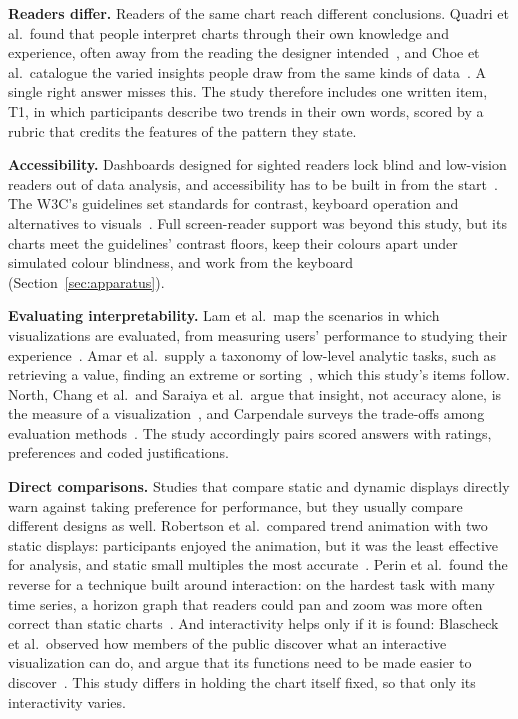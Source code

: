 \documentclass[10pt,twocolumn]{article}
\begin{document}
\textbf{Readers differ.} Readers of the same chart reach different conclusions. Quadri et al.\ found that people interpret charts through their own knowledge and experience, often away from the reading the designer intended~\cite{quadri2024}, and Choe et al.\ catalogue the varied insights people draw from the same kinds of data~\cite{choe2015}. A single right answer misses this. The study therefore includes one written item, T1, in which participants describe two trends in their own words, scored by a rubric that credits the features of the pattern they state.

\textbf{Accessibility.} Dashboards designed for sighted readers lock blind and low-vision readers out of data analysis, and accessibility has to be built in from the start~\cite{srinivasan2023}. The W3C's guidelines set standards for contrast, keyboard operation and alternatives to visuals~\cite{w3cwai}. Full screen-reader support was beyond this study, but its charts meet the guidelines' contrast floors, keep their colours apart under simulated colour blindness, and work from the keyboard (Section~\ref{sec:apparatus}).

\textbf{Evaluating interpretability.} Lam et al.\ map the scenarios in which visualizations are evaluated, from measuring users' performance to studying their experience~\cite{lam2012}. Amar et al.\ supply a taxonomy of low-level analytic tasks, such as retrieving a value, finding an extreme or sorting~\cite{amar2005}, which this study's items follow. North, Chang et al.\ and Saraiya et al.\ argue that insight, not accuracy alone, is the measure of a visualization~\cite{north2006,chang2009,saraiya2006}, and Carpendale surveys the trade-offs among evaluation methods~\cite{carpendale2008}. The study accordingly pairs scored answers with ratings, preferences and coded justifications.

\textbf{Direct comparisons.} Studies that compare static and dynamic displays directly warn against taking preference for performance, but they usually compare different designs as well. Robertson et al.\ compared trend animation with two static displays: participants enjoyed the animation, but it was the least effective for analysis, and static small multiples the most accurate~\cite{robertson2008}. Perin et al.\ found the reverse for a technique built around interaction: on the hardest task with many time series, a horizon graph that readers could pan and zoom was more often correct than static charts~\cite{perin2013}. And interactivity helps only if it is found: Blascheck et al.\ observed how members of the public discover what an interactive visualization can do, and argue that its functions need to be made easier to discover~\cite{blascheck2019}. This study differs in holding the chart itself fixed, so that only its interactivity varies.
\end{document}
